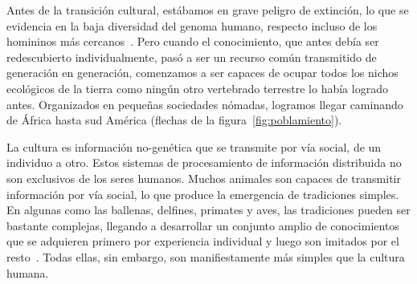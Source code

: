 \documentclass[a4paper,11pt]{book}
\theoremstyle{definition}
\begin{document}
Antes de la transición cultural, estábamos en grave peligro de extinción, lo que se evidencia en la baja diversidad del genoma humano, respecto incluso de los homininos más cercanos~\cite{hrdy2009-mothers}.
%
Pero cuando el conocimiento, que antes debía ser redescubierto individualmente, pasó a ser un recurso común transmitido de generación en generación, comenzamos a ser capaces de ocupar todos los nichos ecológicos de la tierra como ningún otro vertebrado terrestre lo había logrado antes.
%
Organizados en pequeñas sociedades nómadas, logramos llegar caminando de África hasta sud América (flechas de la figura~\ref{fig:poblamiento}).

%
%


La cultura es información no-genética que se transmite por vía social, de un individuo a otro.
%
Estos sistemas de procesamiento de información distribuida no son exclusivos de los seres humanos.
Muchos animales son capaces de transmitir información por vía social, lo que produce la emergencia de tradiciones simples.
En algunas como las ballenas, delfines, primates y aves, las tradiciones pueden ser bastante complejas, llegando a desarrollar un conjunto amplio de conocimientos que se adquieren primero por experiencia individual y luego son imitados por el resto~\cite{aplin2022-birdsCulture}.
%
Todas ellas, sin embargo, son manifiestamente más simples que la cultura humana.
\end{document}
